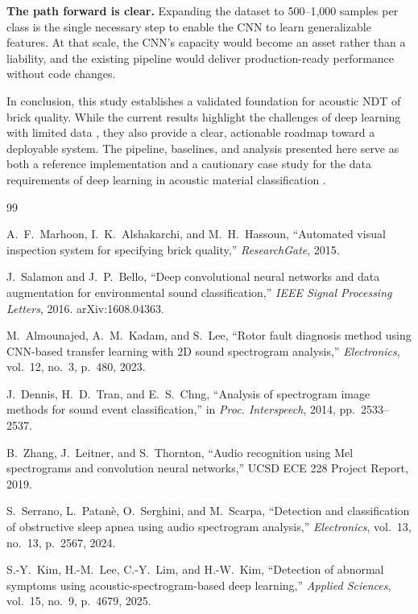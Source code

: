 \documentclass[12pt,a4paper,oneside]{report}
\begin{document}
\textbf{The path forward is clear.} Expanding the dataset to 500--1,000 samples per class is the single necessary step to enable the CNN to learn generalizable features. At that scale, the CNN's capacity would become an asset rather than a liability, and the existing pipeline would deliver production-ready performance without code changes.

In conclusion, this study establishes a validated foundation for acoustic NDT of brick quality. While the current results highlight the challenges of deep learning with limited data \cite{sbcnn2016,zhang2019}, they also provide a clear, actionable roadmap toward a deployable system. The pipeline, baselines, and analysis presented here serve as both a reference implementation and a cautionary case study for the data requirements of deep learning in acoustic material classification \cite{rotor2023,kim2025}.

\newpage

\begin{thebibliography}{99}

A.~F.~Marhoon, I.~K.~Alshakarchi, and M.~H.~Hassoun,
``Automated visual inspection system for specifying brick quality,''
\textit{ResearchGate}, 2015.

J.~Salamon and J.~P.~Bello,
``Deep convolutional neural networks and data augmentation for environmental sound classification,''
\textit{IEEE Signal Processing Letters}, 2016. arXiv:1608.04363.

M.~Almounajed, A.~M.~Kadam, and S.~Lee,
``Rotor fault diagnosis method using CNN-based transfer learning with 2D sound spectrogram analysis,''
\textit{Electronics}, vol.~12, no.~3, p.~480, 2023.

J.~Dennis, H.~D.~Tran, and E.~S.~Chng,
``Analysis of spectrogram image methods for sound event classification,''
in \textit{Proc. Interspeech}, 2014, pp.~2533--2537.

B.~Zhang, J.~Leitner, and S.~Thornton,
``Audio recognition using Mel spectrograms and convolution neural networks,''
UCSD ECE 228 Project Report, 2019.

S.~Serrano, L.~Patan\`{e}, O.~Serghini, and M.~Scarpa,
``Detection and classification of obstructive sleep apnea using audio spectrogram analysis,''
\textit{Electronics}, vol.~13, no.~13, p.~2567, 2024.

S.-Y.~Kim, H.-M.~Lee, C.-Y.~Lim, and H.-W.~Kim,
``Detection of abnormal symptoms using acoustic-spectrogram-based deep learning,''
\textit{Applied Sciences}, vol.~15, no.~9, p.~4679, 2025.

\end{thebibliography}
\end{document}
